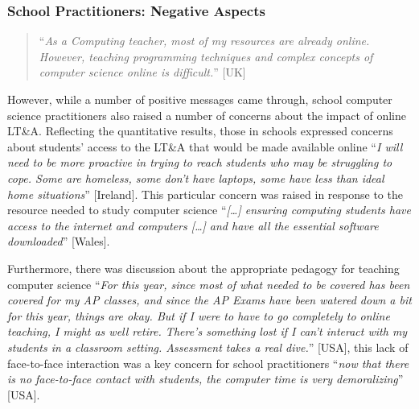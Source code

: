 \documentclass[conference]{IEEEtran}
\begin{document}


\subsubsection{School Practitioners: Negative Aspects}

\begin{quotation}
``{\emph{As a Computing teacher, most of my resources are already
online. However, teaching programming techniques and complex concepts
of computer science online is difficult.}}''  [UK]
\end{quotation}

However, while a number of positive messages came through, school
computer science practitioners also raised a number of concerns about
the impact of online LT\&A. Reflecting the quantitative results, those
in schools expressed concerns about students’ access to the LT\&A that
would be made available online ``{\emph{I will need to be more
proactive in trying to reach students who may be struggling to
cope. Some are homeless, some don't have laptops, some have less than
ideal home situations}}'' [Ireland]. This particular concern was
raised in response to the resource needed to study computer science
``{\emph{[…] ensuring computing students have access to the internet
and computers […] and have all the essential software downloaded}}''
[Wales].

Furthermore, there was discussion about the appropriate pedagogy for
teaching computer science ``{\emph{For this year, since most of what
needed to be covered has been covered for my AP classes, and since the
AP Exams have been watered down a bit for this year, things are
okay. But if I were to have to go completely to online teaching, I
might as well retire. There's something lost if I can't interact with
my students in a classroom setting. Assessment takes a real dive.}}''
[USA], this lack of face-to-face interaction was a key concern for
school practitioners ``{\emph{now that there is no face-to-face
contact with students, the computer time is very demoralizing}}''
[USA].
\end{document}
